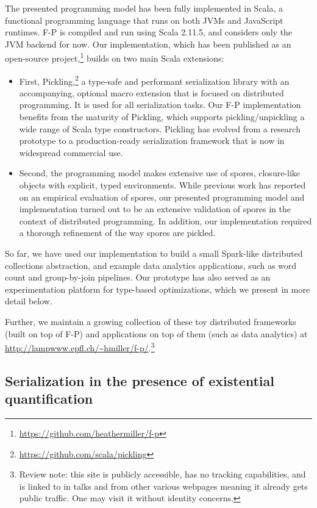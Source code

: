 \documentclass[preprint]{sigplanconf}
\theoremstyle{definition}
\theoremstyle{definition}
\begin{document}
The presented programming model has been fully implemented in Scala, a
functional programming language that runs on both JVMs and JavaScript
runtimes. F-P is compiled and run using Scala 2.11.5, and considers only the
JVM backend for now. Our implementation, which has been published as an
open-source project,\footnote{\url{https://github.com/heathermiller/f-p}} builds on
two main Scala extensions:

\begin{itemize}

\item First, Pickling,\footnote{\url{https://github.com/scala/pickling}} a
type-safe and performant serialization library with an accompanying, optional
macro extension that is focused on distributed programming. It is used for all
serialization tasks. Our F-P implementation benefits from the maturity of
Pickling, which supports pickling/unpickling a wide range of Scala type
constructors. Pickling has evolved from a research prototype to a
production-ready serialization framework that is now in widespread commercial use.

\item Second, the programming model makes extensive use of spores, closure-like
objects with explicit, typed environments. While previous work has reported on
an empirical evaluation of spores, our presented programming model and
implementation turned out to be an extensive validation of spores in the
context of distributed programming. In addition, our implementation required a
thorough refinement of the way spores are pickled.

\end{itemize}

So far, we have used our implementation to build a small Spark-like
distributed collections abstraction, and example data analytics applications,
such as word count and group-by-join pipelines. Our prototype has also served
as an experimentation platform for type-based optimizations, which we present
in more detail below.

Further, we maintain a growing collection of these toy distributed frameworks
(built on top of F-P) and applications on top of them (such as data analytics)
at \url{http://lampwww.epfl.ch/~hmiller/f-p/}.\footnote{Review note: this site
is publicly accessible, has no tracking capabilities, and is linked to in
talks and from other various webpages meaning it already gets public traffic.
One may visit it without identity concerns.}


\subsection{Serialization in the presence of existential quantification}
\end{document}

